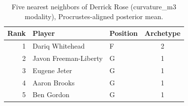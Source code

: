 \begin{table}[htbp]
  \centering\small
  \begin{tabular}{rllc}
    \toprule
    Rank & Player & Position & Archetype \\
    \midrule
    1 & Dariq Whitehead & F & 2 \\
    2 & Javon Freeman-Liberty & G & 1 \\
    3 & Eugene Jeter & G & 1 \\
    4 & Aaron Brooks & G & 1 \\
    5 & Ben Gordon & G & 1 \\
    \bottomrule
  \end{tabular}
  \caption{Five nearest neighbors of Derrick Rose (curvature_m3 modality), Procrustes-aligned posterior mean.}
  \label{tab:Derrick_Rose_neighbors_curvature_m3}
\end{table}

